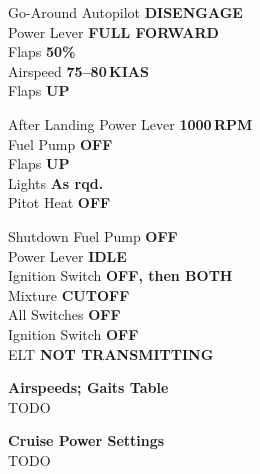 \documentclass{article}
\newcommand{\checkitem}[2]{#1 \dotfill \textbf{#2} \\}
\begin{document}
\begin{multicols}{3}
    \begin{checklistbox}[red]{Go-Around}
        \checkitem{Autopilot}{DISENGAGE}
        \checkitem{Power Lever}{FULL FORWARD}
        \checkitem{Flaps}{50\%}
        \checkitem{Airspeed}{75--80\,KIAS}
        \checkitem{Flaps}{UP}
    \end{checklistbox}

    \begin{checklistbox}[blue]{After Landing}
        \checkitem{Power Lever}{1000\,RPM}
        \checkitem{Fuel Pump}{OFF}
        \checkitem{Flaps}{UP}
        \checkitem{Lights}{As rqd.}
        \checkitem{Pitot Heat}{OFF}
    \end{checklistbox}

    \begin{checklistbox}[purple]{Shutdown}
        \checkitem{Fuel Pump}{OFF}
        \checkitem{Power Lever}{IDLE}
        \checkitem{Ignition Switch}{OFF, then BOTH}
        \checkitem{Mixture}{CUTOFF}
        \checkitem{All Switches}{OFF}
        \checkitem{Ignition Switch}{OFF}
        \checkitem{ELT}{NOT TRANSMITTING}
    \end{checklistbox}

\end{multicols}


\begin{checklistbox}{}
    \textbf{Airspeeds; Gaits Table} \\
    \checkitem{TODO}{}
\end{checklistbox}


\begin{checklistbox}{}
    \textbf{\normalsize Cruise Power Settings} \\
    \checkitem{TODO}{}
\end{checklistbox}
\end{document}
